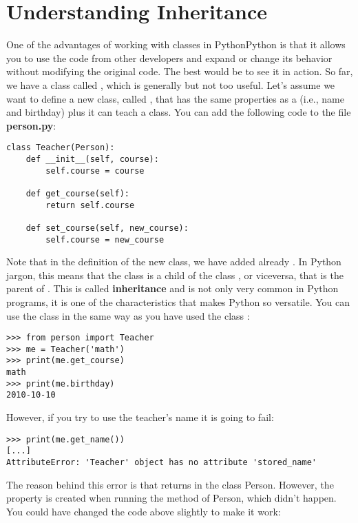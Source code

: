 \section{Understanding Inheritance}\label{sec:inheritance}
One of the advantages of working with classes in PythonPython is that it allows you to use the code from other developers and expand or change its behavior without modifying the original code. The best would be to see it in action. So far, we have a class called , which is generally but not too useful. Let's assume we want to define a new class, called , that has the same properties as a  (i.e., name and birthday) plus it can teach a class. You can add the following code to the file \textbf{person.py}:

\begin{verbatim}
class Teacher(Person):
    def __init__(self, course):
        self.course = course

    def get_course(self):
        return self.course

    def set_course(self, new_course):
        self.course = new_course
\end{verbatim}

Note that in the definition of the new  class, we have added already . In Python jargon, this means that the class  is a child of the class , or viceversa, that  is the parent of . This is called \textbf{inheritance} and is not only very common in Python programs, it is one of the characteristics that makes Python so versatile. You can use the class  in the same way as you have used the class :

\begin{verbatim}
>>> from person import Teacher
>>> me = Teacher('math')
>>> print(me.get_course)
math
>>> print(me.birthday)
2010-10-10
\end{verbatim}

However, if you try to use the teacher's name it is going to fail:

\begin{verbatim}
>>> print(me.get_name())
[...]
AttributeError: 'Teacher' object has no attribute 'stored_name'
\end{verbatim}

The reason behind this error is that  returns  in the class Person. However, the property  is created when running the  method of Person, which didn't happen. You could have changed the code above slightly to make it work:

